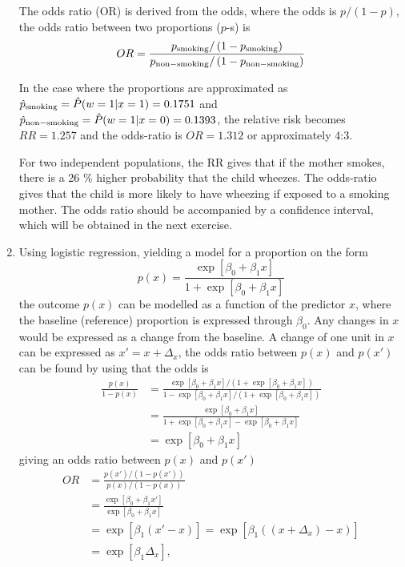 \documentclass[a4paper,11pt]{article}
\begin{document}
\begin{enumerate}[label=3\alph*)]
        The odds ratio (OR) is derived from the odds, where the odds is $p/(1-p)$, the odds ratio between two proportions ($p$-s) is
        \begin{equation}
            OR = \frac{p_{\rm smoking} / \left( 1-p_{\rm smoking} \right)}{p_{\rm non-smoking} / \left( 1-p_{\rm non-smoking} \right)}
            \label{eq:OR}
        \end{equation}

        In the case where the proportions are approximated as $\hat{p}_{\rm smoking} = \hat{P}(w=1 | x=1 ) = 0.1751$ and $\hat{p}_{\rm non-smoking} = \hat{P}(w=1 | x=0) = 0.1393$, the relative risk becomes $RR = 1.257$ and the odds-ratio is $OR = 1.312$ or approximately 4:3. 

        For two independent populations, the RR gives that if the mother smokes, there is a 26 \% higher probability that the child wheezes. The odds-ratio gives that the child is more likely to have wheezing if exposed to a smoking mother. The odds ratio should be accompanied by a confidence interval, which will be obtained in the next exercise. 

    \item Using logistic regression, yielding a model for a proportion on the form
        \begin{equation}
            p(x) = \frac{\exp\left[ \beta_0 + \beta_1 x \right]}{1 + \exp\left[ \beta_0 + \beta_1 x \right]}
            \label{eq:logit}
        \end{equation}
        the outcome $p(x)$ can be modelled as a function of the predictor $x$, where the baseline (reference) proportion is expressed through $\beta_0$. Any changes in $x$ would be expressed as a change from the baseline. A change of one unit in $x$ can be expressed as $x' = x + \Delta_x$, the odds ratio between $p(x)$ and $p(x')$ can be found by using that the odds is 
        \begin{align*}
            \frac{p(x)}{1 - p(x)} &= \frac{\exp\left[ \beta_0 + \beta_1 x \right] / \left( 1 + \exp\left[ \beta_0 + \beta_1 x \right] \right)}{1 - \exp\left[ \beta_0 + \beta_1 x \right]/\left( 1 + \exp\left[ \beta_0 + \beta_1 x \right] \right)} \\
            &= \frac{\exp\left[ \beta_0 + \beta_1 x \right]}{1 + \exp\left[ \beta_0 + \beta_1 x \right] - \exp\left[ \beta_0 + \beta_1 x \right]} \\
            &= \exp\left[ \beta_0 + \beta_1 x \right]
        \end{align*}
        giving an odds ratio between $p(x)$ and $p(x')$
        \begin{align*}
            OR &= \frac{p(x')/\left( 1 - p(x') \right)}{p(x)/\left( 1-p(x) \right)} \\
            &= \frac{\exp\left[ \beta_0 + \beta_1 x' \right]}{\exp\left[ \beta_0 + \beta_1 x \right]} \\
            &= \exp\left[ \beta_1 \left( x' - x \right) \right] = \exp\left[ \beta_1 \left( (x + \Delta_x) - x \right) \right] \\
            &= \exp\left[ \beta_1 \Delta_x \right],
        \end{align*}


\end{enumerate}
\end{document}
